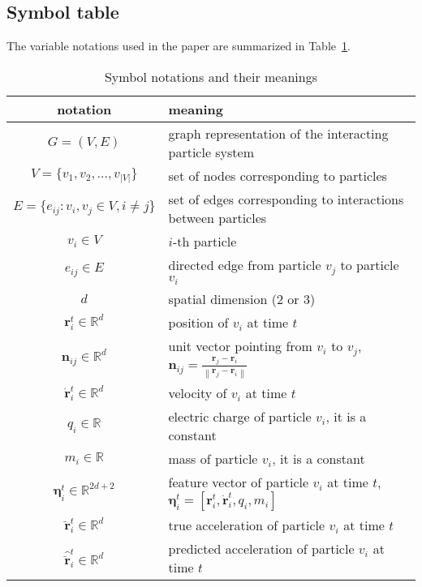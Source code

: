 \documentclass{article}
\newcommand{\norm}[1]{\left\lVert#1\right\rVert}
\newcommand\Tstrut{\rule{0pt}{2.2ex}}         %
\newcommand\Bstrut{\rule[-1ex]{0pt}{0pt}}   %
\begin{document}
\subsection{Symbol table}
The variable notations used in the paper are summarized in Table~\ref{tab:symbol_notations}.
\begin{table}[h!]
\centering
\caption{Symbol notations and their meanings}
\label{tab:symbol_notations}

{ \small
\begin{tabularx}{\textwidth}{|c X|} 
 \hline
    \textbf{notation} & \textbf{meaning}\\[0.75ex]
\hline \rule{0pt}{2ex}
$G=(V, E)$ & graph representation of the interacting particle system \Tstrut\Bstrut \\
\hline
$V = \{v_1, v_2, \ldots, v_{|V|}\}$ &  set of nodes corresponding to particles  \Tstrut\Bstrut\\
\hline
$E = \{e_{ij}: v_i, v_j \in V, i\neq j\}$ & set of edges  corresponding to interactions between particles  \Tstrut\Bstrut\\
\hline
$v_i \in V$ & $i$-th particle  \Tstrut\Bstrut\\
\hline
$e_{ij} \in E$ & directed edge from particle $v_j$ to particle $v_i$  \Tstrut\Bstrut\\
\hline
$d$ & spatial dimension (2 or 3)  \Tstrut\Bstrut\\
\hline
$\bm{r}_i^t \in \mathbb{R}^d$ & position of $v_i$ at time $t$  \Tstrut\Bstrut\\
\hline
$\bm{n}_{ij} \in \mathbb{R}^d$ & unit vector pointing from $v_i$ to $v_j$, $\bm{n}_{ij} = \frac{\bm{r}_j - \bm{r}_i}{\norm{\bm{r}_j - \bm{r}_i}}$ \Tstrut\Bstrut\\
\hline
$\bm{\dot{r}}_i^t \in \mathbb{R}^d$ & velocity of $v_i$ at time $t$  \Tstrut\Bstrut\\
\hline
$q_i \in \mathbb{R} $ & electric charge of particle $v_i$, it is a constant  \Tstrut\Bstrut\\
\hline
$m_i \in \mathbb{R} $ & mass of particle $v_i$, it is a constant  \Tstrut\Bstrut\\
\hline
$\bm{\eta}_i^t \in \mathbb{R}^{2d+2}$ & feature vector of particle $v_i$ at time $t$, $\bm{\eta}_i^t = [\bm{r}_i^t, \bm{\dot{r}}_i^t, q_i, m_i]$ \Tstrut\Bstrut\\
\hline
$\bm{\ddot{r}}_i^t \in \mathbb{R}^{d}$ & true acceleration of particle $v_i$ at time $t$  \Tstrut\Bstrut\\
\hline
$\bm{\hat{\ddot{r}}}_i^t \in \mathbb{R}^{d}$ & predicted acceleration of particle $v_i$ at time $t$  \Tstrut\Bstrut\\

\end{tabularx}}
\end{table}
\end{document}
